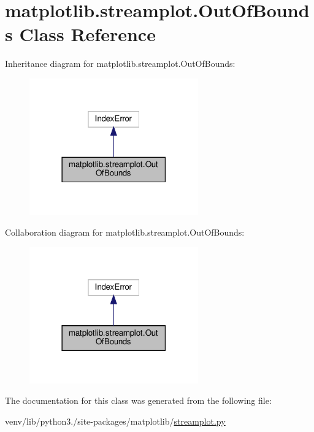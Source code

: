 \hypertarget{classmatplotlib_1_1streamplot_1_1OutOfBounds}{}\section{matplotlib.\+streamplot.\+Out\+Of\+Bounds Class Reference}
\label{classmatplotlib_1_1streamplot_1_1OutOfBounds}


Inheritance diagram for matplotlib.\+streamplot.\+Out\+Of\+Bounds\+:
\nopagebreak
\begin{figure}[H]
\begin{center}
\leavevmode
\includegraphics[width=206pt]{classmatplotlib_1_1streamplot_1_1OutOfBounds__inherit__graph}
\end{center}
\end{figure}


Collaboration diagram for matplotlib.\+streamplot.\+Out\+Of\+Bounds\+:
\nopagebreak
\begin{figure}[H]
\begin{center}
\leavevmode
\includegraphics[width=206pt]{classmatplotlib_1_1streamplot_1_1OutOfBounds__coll__graph}
\end{center}
\end{figure}


The documentation for this class was generated from the following file\+:\begin{DoxyCompactItemize}
\item 
venv/lib/python3./site-\/packages/matplotlib/\hyperlink{streamplot_8py}{streamplot.\+py}\end{DoxyCompactItemize}
